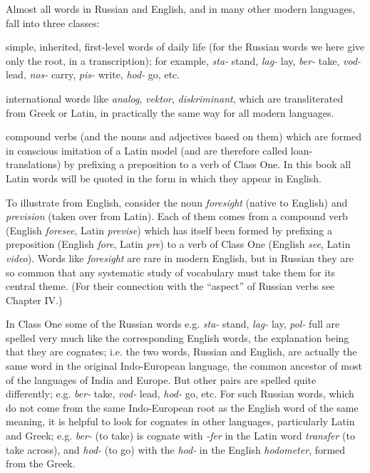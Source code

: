 
Almost all words in Russian and English, and in many other modern languages, fall into three classes:

\begin{description}[style=nextline,leftmargin=2.2em,labelwidth=1.7em]
\item[Class One] simple, inherited, first-level words of daily life (for the Russian words we here give only the root, in a transcription); for example, \emph{sta-} stand, \emph{lag-} lay, \emph{ber-} take, \emph{vod-} lead, \emph{nos-} carry, \emph{pis-} write, \emph{hod-} go, etc.
\item[Class Two] international words like \emph{analog}, \emph{vektor}, \emph{diskriminant}, which are transliterated from Greek or Latin, in practically the same way for all modern languages.
\item[Class Three] compound verbs (and the nouns and adjectives based on them) which are formed in conscious imitation of a Latin model (and are therefore called loan-translations) by prefixing a preposition to a verb of Class One. In this book all Latin words will be quoted in the form in which they appear in English.
\end{description}

To illustrate from English, consider the noun \emph{foresight} (native to English) and \emph{prevision} (taken over from Latin). Each of them comes from a compound verb (English \emph{foresee}, Latin \emph{previse}) which has itself been formed by prefixing a preposition (English \emph{fore}, Latin \emph{pre}) to a verb of Class One (English \emph{see}, Latin \emph{video}). Words like \emph{foresight} are rare in modern English, but in Russian they are so common that any systematic study of vocabulary must take them for its central theme. (For their connection with the ``aspect'' of Russian verbs see Chapter IV.)

In Class One some of the Russian words e.g. \emph{sta-} stand, \emph{lag-} lay, \emph{pol-} full are spelled very much like the corresponding English words, the explanation being that they are cognates; i.e. the two words, Russian and English, are actually the same word in the original Indo-European language, the common ancestor of most of the languages of India and Europe. But other pairs are spelled quite differently; e.g. \emph{ber-} take, \emph{vod-} lead, \emph{hod-} go, etc. For such Russian words, which do not come from the same Indo-European root as the English word of the same meaning, it is helpful to look for cognates in other languages, particularly Latin and Greek; e.g. \emph{ber-} (to take) is cognate with \emph{-fer} in the Latin word \emph{transfer} (to take across), and \emph{hod-} (to go) with the \emph{hod-} in the English \emph{hodometer}, formed from the Greek.

